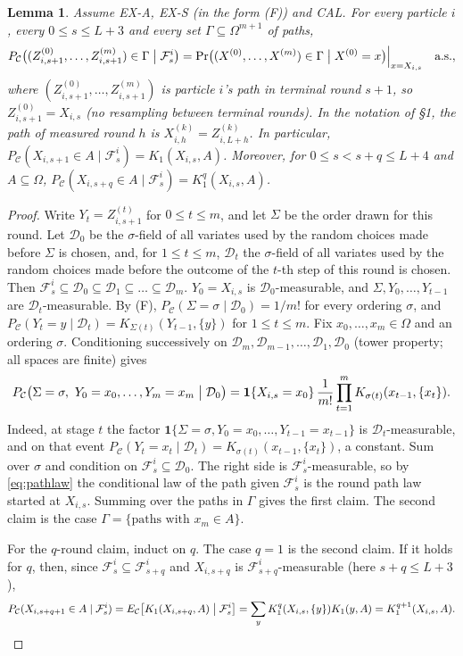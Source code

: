 \documentclass[11pt]{article}
\newtheorem{lemma}[theorem]{Lemma}
\theoremstyle{remark}
\newcommand{\one}{\mathbf 1}
\newcommand{\C}{\mathcal C}
\newcommand{\Pc}{P_{\C}}
\newcommand{\Ec}{E_{\C}}
\begin{document}
\begin{lemma}\label{lem:markov}
Assume EX-A, EX-S (in the form (F)) and CAL. For every particle $i$, every $0\le s\le L+3$ and every set $\Gamma\subseteq\Omega^{m+1}$ of paths,
\[
\Pc\bigl((Z^{(0)}_{i,s+1},\dots,Z^{(m)}_{i,s+1})\in\Gamma\bigm|\mathcal F^i_s\bigr)=\Pr\bigl((X^{(0)},\dots,X^{(m)})\in\Gamma\bigm|X^{(0)}=x\bigr)\Big|_{x=X_{i,s}}\quad\text{a.s.},
\]
where $(Z^{(0)}_{i,s+1},\dots,Z^{(m)}_{i,s+1})$ is particle $i$'s path in terminal round $s+1$, so $Z^{(0)}_{i,s+1}=X_{i,s}$ (no resampling between terminal rounds). In the notation of \S1, the path of measured round $h$ is $X^{(k)}_{i,h}=Z^{(k)}_{i,L+h}$. In particular, $\Pc(X_{i,s+1}\in A\mid\mathcal F^i_s)=K_1(X_{i,s},A)$. Moreover, for $0\le s<s+q\le L+4$ and $A\subseteq\Omega$, $\Pc(X_{i,s+q}\in A\mid\mathcal F^i_s)=K_1^{q}(X_{i,s},A)$.
\end{lemma}

\begin{proof}
Write $Y_t=Z^{(t)}_{i,s+1}$ for $0\le t\le m$, and let $\Sigma$ be the order drawn for this round. Let $\mathcal D_0$ be the $\sigma$-field of all variates used by the random choices made before $\Sigma$ is chosen, and, for $1\le t\le m$, $\mathcal D_t$ the $\sigma$-field of all variates used by the random choices made before the outcome of the $t$-th step of this round is chosen. Then $\mathcal F^i_s\subseteq\mathcal D_0\subseteq\mathcal D_1\subseteq\dots\subseteq\mathcal D_m$. $Y_0=X_{i,s}$ is $\mathcal D_0$-measurable, and $\Sigma,Y_0,\dots,Y_{t-1}$ are $\mathcal D_t$-measurable. By (F), $\Pc(\Sigma=\sigma\mid\mathcal D_0)=1/m!$ for every ordering $\sigma$, and $\Pc(Y_t=y\mid\mathcal D_t)=K_{\Sigma(t)}(Y_{t-1},\{y\})$ for $1\le t\le m$. Fix $x_0,\dots,x_m\in\Omega$ and an ordering $\sigma$. Conditioning successively on $\mathcal D_m,\mathcal D_{m-1},\dots,\mathcal D_1,\mathcal D_0$ (tower property; all spaces are finite) gives
\[
\Pc\bigl(\Sigma=\sigma,\ Y_0=x_0,\dots,Y_m=x_m\bigm|\mathcal D_0\bigr)=\one\{X_{i,s}=x_0\}\,\frac1{m!}\prod_{t=1}^mK_{\sigma(t)}(x_{t-1},\{x_t\}).
\]
Indeed, at stage $t$ the factor $\one\{\Sigma=\sigma,Y_0=x_0,\dots,Y_{t-1}=x_{t-1}\}$ is $\mathcal D_t$-measurable, and on that event $\Pc(Y_t=x_t\mid\mathcal D_t)=K_{\sigma(t)}(x_{t-1},\{x_t\})$, a constant. Sum over $\sigma$ and condition on $\mathcal F^i_s\subseteq\mathcal D_0$. The right side is $\mathcal F^i_s$-measurable, so by \eqref{eq:pathlaw} the conditional law of the path given $\mathcal F^i_s$ is the round path law started at $X_{i,s}$. Summing over the paths in $\Gamma$ gives the first claim. The second claim is the case $\Gamma=\{\text{paths with }x_m\in A\}$.

For the $q$-round claim, induct on $q$. The case $q=1$ is the second claim. If it holds for $q$, then, since $\mathcal F^i_s\subseteq\mathcal F^i_{s+q}$ and $X_{i,s+q}$ is $\mathcal F^i_{s+q}$-measurable (here $s+q\le L+3$),
\[
\Pc(X_{i,s+q+1}\in A\mid\mathcal F^i_s)=\Ec\bigl[K_1(X_{i,s+q},A)\bigm|\mathcal F^i_s\bigr]=\sum_{y}K_1^{q}(X_{i,s},\{y\})K_1(y,A)=K_1^{q+1}(X_{i,s},A).\qedhere
\]
\end{proof}
\end{document}

